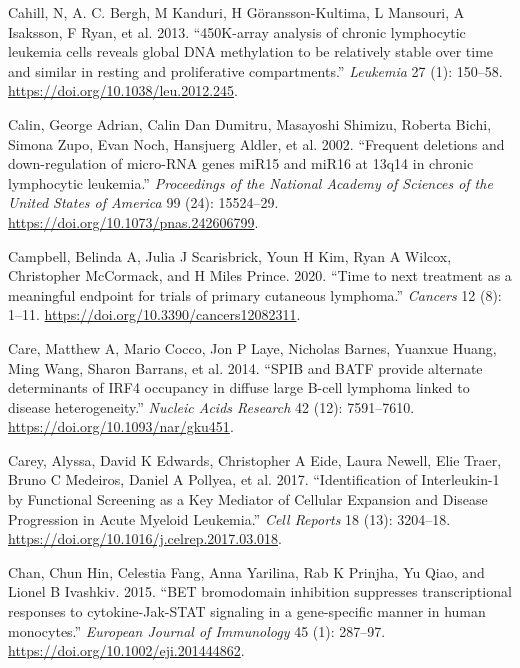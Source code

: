 \documentclass[11pt, a4paper, twosided]{book}
\newenvironment{CSLReferences}%
  {}%
  {\par}
\begin{document}
\begin{CSLReferences}{1}{0}
\leavevmode{}%
Cahill, N, A. C. Bergh, M Kanduri, H Göransson-Kultima, L Mansouri, A Isaksson, F Ryan, et al. 2013. {``{450K-array analysis of chronic lymphocytic leukemia cells reveals global DNA methylation to be relatively stable over time and similar in resting and proliferative compartments}.''} \emph{Leukemia} 27 (1): 150--58. \url{https://doi.org/10.1038/leu.2012.245}.

\leavevmode{}%
Calin, George Adrian, Calin Dan Dumitru, Masayoshi Shimizu, Roberta Bichi, Simona Zupo, Evan Noch, Hansjuerg Aldler, et al. 2002. {``{Frequent deletions and down-regulation of micro-RNA genes miR15 and miR16 at 13q14 in chronic lymphocytic leukemia}.''} \emph{Proceedings of the National Academy of Sciences of the United States of America} 99 (24): 15524--29. \url{https://doi.org/10.1073/pnas.242606799}.

\leavevmode{}%
Campbell, Belinda A, Julia J Scarisbrick, Youn H Kim, Ryan A Wilcox, Christopher McCormack, and H Miles Prince. 2020. {``{Time to next treatment as a meaningful endpoint for trials of primary cutaneous lymphoma}.''} \emph{Cancers} 12 (8): 1--11. \url{https://doi.org/10.3390/cancers12082311}.

\leavevmode{}%
Care, Matthew A, Mario Cocco, Jon P Laye, Nicholas Barnes, Yuanxue Huang, Ming Wang, Sharon Barrans, et al. 2014. {``{SPIB and BATF provide alternate determinants of IRF4 occupancy in diffuse large B-cell lymphoma linked to disease heterogeneity}.''} \emph{Nucleic Acids Research} 42 (12): 7591--7610. \url{https://doi.org/10.1093/nar/gku451}.

\leavevmode{}%
Carey, Alyssa, David K Edwards, Christopher A Eide, Laura Newell, Elie Traer, Bruno C Medeiros, Daniel A Pollyea, et al. 2017. {``{Identification of Interleukin-1 by Functional Screening as a Key Mediator of Cellular Expansion and Disease Progression in Acute Myeloid Leukemia}.''} \emph{Cell Reports} 18 (13): 3204--18. \url{https://doi.org/10.1016/j.celrep.2017.03.018}.

\leavevmode{}%
Chan, Chun Hin, Celestia Fang, Anna Yarilina, Rab K Prinjha, Yu Qiao, and Lionel B Ivashkiv. 2015. {``{BET bromodomain inhibition suppresses transcriptional responses to cytokine-Jak-STAT signaling in a gene-specific manner in human monocytes.}''} \emph{European Journal of Immunology} 45 (1): 287--97. \url{https://doi.org/10.1002/eji.201444862}.


\end{CSLReferences}
\end{document}
